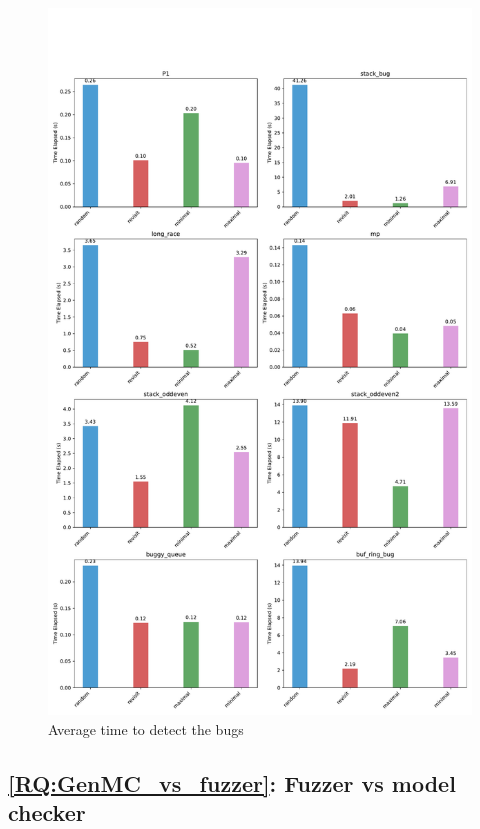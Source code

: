 \begin{figure}[h!tbp]
	\centering
	\includegraphics[scale=0.3]{figure/genmc-bug/time_elapsed.pdf}
	\caption{Average time to detect the bugs}
	\label{genmc-bug-time}
\end{figure}


\subsection{\ref*{RQ:GenMC_vs_fuzzer}: Fuzzer vs model checker }


